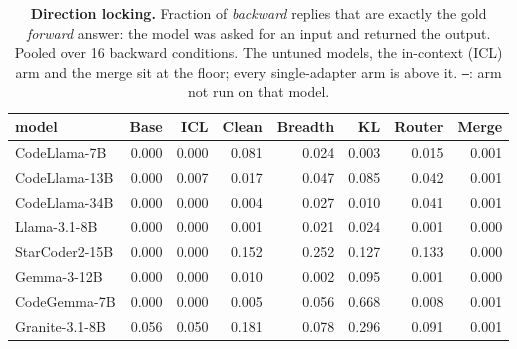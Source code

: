 \begin{table}[t]
\centering\small
\caption{\textbf{Direction locking.} Fraction of \emph{backward} replies that are exactly the gold \emph{forward} answer: the model was asked for an input and returned the output. Pooled over 16 backward conditions. The untuned models, the in-context (ICL) arm and the merge sit at the floor; every single-adapter arm is above it. \texttt{--}: arm not run on that model.}
\label{tab:dirlock}
\begin{tabular}{@{}lrrrrrrr@{}}
\toprule
model & Base & ICL & Clean & Breadth & KL & Router & Merge \\
\midrule
CodeLlama-7B & 0.000 & 0.000 & 0.081 & 0.024 & 0.003 & 0.015 & 0.001 \\
CodeLlama-13B & 0.000 & 0.007 & 0.017 & 0.047 & 0.085 & 0.042 & 0.001 \\
CodeLlama-34B & 0.000 & 0.000 & 0.004 & 0.027 & 0.010 & 0.041 & 0.001 \\
Llama-3.1-8B & 0.000 & 0.000 & 0.001 & 0.021 & 0.024 & 0.001 & 0.000 \\
StarCoder2-15B & 0.000 & 0.000 & 0.152 & 0.252 & 0.127 & 0.133 & 0.000 \\
Gemma-3-12B & 0.000 & 0.000 & 0.010 & 0.002 & 0.095 & 0.001 & 0.000 \\
CodeGemma-7B & 0.000 & 0.000 & 0.005 & 0.056 & 0.668 & 0.008 & 0.001 \\
Granite-3.1-8B & 0.056 & 0.050 & 0.181 & 0.078 & 0.296 & 0.091 & 0.001 \\
\bottomrule
\end{tabular}
\end{table}
